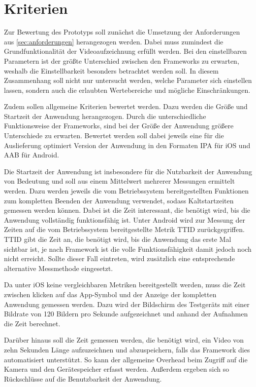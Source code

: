 \section{Kriterien}
\label{sec:kriterien}

Zur Bewertung des Prototyps soll zunächst die Umsetzung der Anforderungen aus \autoref{sec:anforderungen} herangezogen werden.
Dabei muss zumindest die Grundfunktionalität der Videoaufzeichnung erfüllt werden.
Bei den einstellbaren Parametern ist der größte Unterschied zwischen den Frameworks zu erwarten, weshalb die Einstellbarkeit besonders betrachtet werden soll.
In diesem Zusammenhang soll nicht nur untersucht werden, welche Parameter sich einstellen lassen, sondern auch die erlaubten Wertebereiche und mögliche Einschränkungen.


Zudem sollen allgemeine Kriterien bewertet werden.
Dazu werden die Größe und Startzeit der Anwendung herangezogen.
Durch die unterschiedliche Funktionsweise der Frameworks, sind bei der Größe der Anwendung größere Unterschiede zu erwarten.
Bewertet werden soll dabei jeweils eine für die Auslieferung optimiert Version der Anwendung in den Formaten \ac{IPA} für iOS und \ac{AAB} für Android.

Die Startzeit der Anwendung ist insbesondere für die Nutzbarkeit der Anwendung von Bedeutung und soll aus einem Mittelwert mehrerer Messungen ermittelt werden.
Dazu werden jeweils die vom Betriebssystem bereitgestellten Funktionen zum kompletten Beenden der Anwendung verwendet, sodass Kaltstartzeiten gemessen werden können.
Dabei ist die Zeit interessant, die benötigt wird, bis die Anwendung vollständig funktionsfähig ist.
Unter Android wird zur Messung der Zeiten auf die vom Betriebssystem bereitgestellte Metrik \ac{TTID} zurückgegriffen.
\ac{TTID} gibt die Zeit an, die benötigt wird, bis die Anwendung das erste Mal sichtbar ist, je nach Framework ist die volle Funktionsfähigkeit damit jedoch noch nicht erreicht.
Sollte dieser Fall eintreten, wird zusätzlich eine entsprechende alternative Messmethode eingesetzt.

Da unter iOS keine vergleichbaren Metriken bereitgestellt werden, muss die Zeit zwischen klicken auf das App-Symbol und der Anzeige der kompletten Anwendung gemessen werden.
Dazu wird der Bildschirm des Testgeräts mit einer Bildrate von 120 Bildern pro Sekunde aufgezeichnet und anhand der Aufnahmen die Zeit berechnet.


Darüber hinaus soll die Zeit gemessen werden, die benötigt wird, ein Video von zehn Sekunden Länge aufzuzeichnen und abzuspeichern, falls das Framework dies automatisiert unterstützt.
So kann der allgemeine Overhead beim Zugriff auf die Kamera und den Gerätespeicher erfasst werden.
Außerdem ergeben sich so Rückschlüsse auf die Benutzbarkeit der Anwendung.